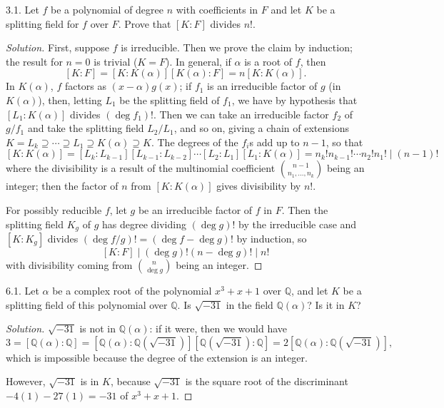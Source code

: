 \documentclass[10pt]{scrartcl}
\providecommand{\QQ}{\mathbb Q}
\newenvironment{soln}{\begin{proof}[Solution]}{\end{proof}}
\begin{document}
\begin{problem*}3.1.
	Let $f$ be a polynomial of degree $n$ with coefficients in $F$
	and let $K$ be a splitting field for $f$ over $F$.
	Prove that $[K:F]$ divides $n!$.
\end{problem*}

\begin{soln}
	First, suppose $f$ is irreducible. Then we prove the claim by induction;
	the result for $n=0$ is trivial ($K=F$).
	In general, if $\alpha$ is a root of $f$, then
	\[[K:F] = [K:K(\alpha)][K(\alpha):F] = n[K:K(\alpha)].\]
	In $K(\alpha)$, $f$ factors as $(x-\alpha)g(x)$; if $f_1$
	is an irreducible factor of $g$ (in $K(\alpha)$),
	then, letting $L_1$ be the splitting field of $f_1$,
	we have by hypothesis that $[L_1:K(\alpha)]$ divides
	$(\deg f_1)!$. Then we can take an irreducible factor $f_2$
	of $g/f_1$ and take the splitting field $L_2/L_1$, and so on,
	giving a chain of extensions
	$K = L_k\supseteq\cdots\supseteq L_1\supseteq K(\alpha)\supseteq K$.
	The degrees of the $f_i$s add up to $n-1$, so that
	\[[K:K(\alpha)] =
	[L_k:L_{k-1}][L_{k-1}:L_{k-2}]\cdots[L_2:L_1][L_1:K(\alpha)]
	= n_k!n_{k-1}!\cdots n_2!n_1!\mid (n-1)!\]
	where the divisibility is a result of the multinomial coefficient
	$\binom{n-1}{n_1,\dots,n_k}$ being an integer; then the factor of $n$
	from $[K:K(\alpha)]$ gives divisibility by $n!$.
	
	For possibly reducible $f$, let $g$ be an irreducible
	factor of $f$ in $F$. Then the splitting field $K_g$ of $g$
	has degree dividing $(\deg g)!$ by the irreducible case
	and $[K:K_g]$ divides $(\deg f/g)! = (\deg f - \deg g)!$ by induction, so
	\[[K:F] \mid (\deg g)!(n - \deg g)!\mid n!\]
	with divisibility coming from $\binom n{\deg g}$ being an integer.
\end{soln}

\begin{problem*}6.1.
	Let $\alpha$ be a complex root of the polynomial $x^3+x+1$
	over $\QQ$, and let $K$ be a splitting field of this polynomial over $\QQ$.
	Is $\sqrt{-31}$ in the field $\QQ(\alpha)$? Is it in $K$?
\end{problem*}

\begin{soln}
	$\sqrt{-31}$ is not in $\QQ(\alpha)$: if it were, then we would have
	\[3 = [\QQ(\alpha):\QQ] = [\QQ(\alpha):\QQ(\sqrt{-31})]
	[\QQ(\sqrt{-31}):\QQ] = 2[\QQ(\alpha):\QQ(\sqrt{-31})],\]
	which is impossible because the degree of the extension is an integer.
	
	However, $\sqrt{-31}$ is in $K$, because $\sqrt{-31}$ is the square root
	of the discriminant $-4(1) - 27(1) = -31$ of $x^3+x+1$.
\end{soln}
\end{document}
